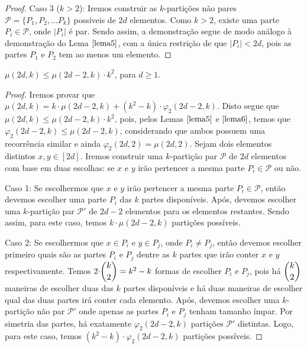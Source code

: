 \documentclass[12pt]{article}
\begin{document}
{\begin{proof}
	
	Caso 3 ($k > 2$): Iremos construir as $k$-partições não pares $\mathcal{P} = \{P_1, P_2, \ldots P_k\}$ possíveis de $2d$ elementos. Como $k > 2$, existe uma parte $P_i \in \mathcal{P}$, onde $|P_i|$ é par. Sendo assim, a demonstração segue de modo análogo à demonstração do Lema $\ref{lema5}$, com a única restrição de que $|P_i| < 2d$, pois as partes $P_1$ e $P_2$ tem ao menos um elemento.
\end{proof} \newl
  

\begin{lema} 
	\label{lema7} 
	$\mu(2d, k) \leq \mu(2d - 2, k) {\cdot} k^{2}$, para $d \geq 1$.
\end{lema}

\begin{proof}
	Iremos provar que $\mu(2d, k) = k {\cdot} \mu(2d - 2, k) + (k^2 - k) {\cdot} \varphi_2(2d - 2, k)$. Disto segue que $\mu(2d, k) \leq \mu(2d - 2, k) {\cdot} k^{2}$, pois, pelos Lemas $\ref{lema5}$ e $\ref{lema6}$, temos que $\varphi_2(2d - 2, k) \leq \mu(2d - 2, k)$, considerando que ambos possuem uma recorrência similar e ainda $\varphi_2(2d, 2) = \mu(2d, 2)$. Sejam dois elementos distintos $x, y \in [2d]$. Iremos construir uma $k$-partição par $\mathcal{P}$ de $2d$ elementos com base em duas escolhas: se $x$ e $y$ irão pertencer a mesma parte $P_i \in \mathcal{P}$ ou não. \newl
	
	Caso 1: Se escolhermos que $x$ e $y$ irão pertencer a mesma parte $P_i \in \mathcal{P}$, então devemos escolher uma parte $P_i$ das $k$ partes disponíveis. Após, devemos escolher uma $k$-partição par $\mathcal{P'}$ de $2d - 2$ elementos para os elementos restantes. Sendo assim, para este caso, temos $k {\cdot} \mu(2d - 2, k)$ partições possíveis. \newl 
	
	Caso 2: Se escolhermos que $x \in P_i$ e $y \in P_j$, onde $P_i \neq P_j$, então devemos escolher primeiro quais são as partes $P_i$ e $P_j$ dentre as $k$ partes que irão conter $x$ e $y$ respectivamente. Temos $2 {\cdot} \escolhe{k}{2} = k^2 - k$ formas de escolher $P_i$ e $P_j$, pois há $\escolhe{k}{2}$ maneiras de escolher duas das $k$ partes disponíveis e há duas maneiras de escolher qual das duas partes irá conter cada elemento. Após, devemos escolher uma $k$-partição não par $\mathcal{P'}$ onde apenas as partes $P_i$ e $P_j$ tenham tamanho ímpar. Por simetria das partes, há exatamente $\varphi_2(2d - 2, k)$ partições $\mathcal{P'}$ distintas. Logo, para este caso, temos $(k^2 - k) {\cdot} \varphi_2(2d - 2, k)$ partições possíveis.
	
	
\end{proof} \newl


}
\end{document}
